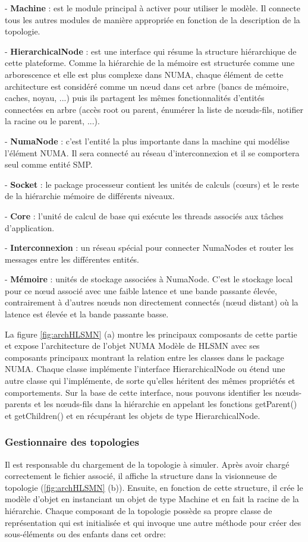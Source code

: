 - \textbf{Machine} : est le module principal à activer pour utiliser le modèle. Il connecte tous les autres modules de manière appropriée en fonction de la description de la topologie.

- \textbf{HierarchicalNode} : est une interface qui résume la structure hiérarchique de cette plateforme. Comme la hiérarchie de la mémoire est structurée comme une arborescence et elle est plus complexe dans NUMA, chaque élément de cette architecture est considéré comme un nœud dans cet arbre (bancs de mémoire, caches, noyau, ...) puis ils partagent les mêmes fonctionnalités d'entités connectées en arbre (accès root ou parent, énumérer la liste de nœuds-fils, notifier la racine ou le parent, ...).

- \textbf{NumaNode} : c'est l'entité la plus importante dans la machine qui modélise l'élément NUMA. Il sera connecté au réseau d'interconnexion et il se comportera seul comme entité SMP.

- \textbf{Socket} : le package processeur contient les unités de calculs (cœurs) et le reste de la hiérarchie mémoire de différents niveaux.

- \textbf{Core} : l'unité de calcul de base qui exécute les threads associés aux tâches d'application.

- \textbf{Interconnexion} : un réseau spécial pour connecter NumaNodes et router les messages entre les différentes entités.

- \textbf{Mémoire} : unités de stockage associées à NumaNode. C'est le stockage local pour ce nœud associé avec une faible latence et une bande passante élevée, contrairement à d'autres nœuds non directement connectés (nœud distant) où la latence est élevée et la bande passante basse.

La figure \ref{fig:archHLSMN} (a) montre les principaux composants de cette partie et expose l'architecture de l'objet NUMA Modèle de HLSMN avec ses composants principaux montrant la relation entre les classes dans le package NUMA. Chaque classe implémente l'interface HierarchicalNode ou étend une autre classe qui l'implémente, de sorte qu'elles héritent des mêmes propriétés et comportements. Sur la base de cette interface, nous pouvons identifier les nœuds-parents et les nœuds-fils dans la hiérarchie en appelant les fonctions getParent() et getChildren() et en récupérant les objets de type HierarchicalNode.
%
\subsubsection{Gestionnaire des topologies}
%
Il est responsable du chargement de la topologie à simuler. Après avoir chargé correctement le fichier associé, il affiche la structure dans la visionneuse de topologie (\ref{fig:archHLSMN} (b)). Ensuite, en fonction de cette structure, il crée le modèle d'objet en instanciant un objet de type Machine et en fait la racine de la hiérarchie. Chaque composant de la topologie possède sa propre classe de représentation qui est initialisée et qui invoque une autre méthode pour créer des sous-éléments ou des enfants dans cet ordre:
%
